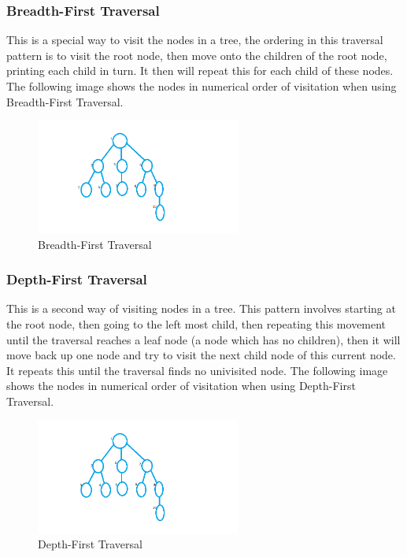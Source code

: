 \documentclass[10pt,twocolumn]{IEEEtran}
\begin{document}
\subsubsection{Breadth-First Traversal}
This is a special way to visit the nodes in a tree, the ordering in this traversal pattern is to visit the root node, then move onto the children of the root node, printing each child in turn. It then will repeat this for each child of these nodes. The following image shows the nodes in numerical order of visitation when using Breadth-First Traversal. 
\begin{figure}[h]
\includegraphics[width=0.6\textwidth]{bfs.png}
\caption{Breadth-First Traversal}
\end{figure}
 
\subsubsection{Depth-First Traversal}
This is a second way of visiting nodes in a tree. This pattern involves starting at the root node, then going to the left most child, then repeating this movement until the traversal reaches a leaf node (a node which has no children), then it will move back up one node and try to visit the next child node of this current node. It repeats this until the traversal finds no univisited node. The following image shows the nodes in numerical order of visitation when using Depth-First Traversal. 
\begin{figure}[h]
\includegraphics[width=0.6\textwidth]{dfs.png}
\caption{Depth-First Traversal}
\end{figure}
\end{document}
